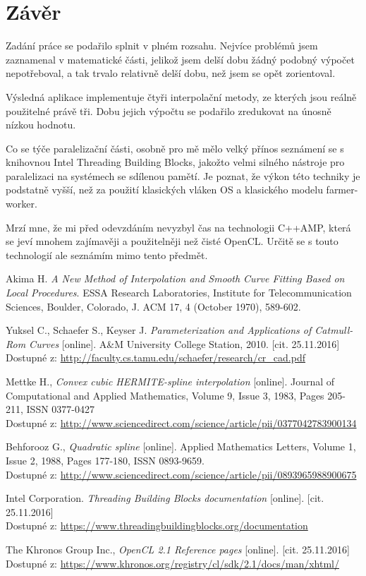 \documentclass[]{thesiskiv}
\begin{document}
\chapter{Závěr}

Zadání práce se podařilo splnit v plném rozsahu. Nejvíce problémů jsem zaznamenal v matematické části, jelikož jsem delší dobu žádný podobný výpočet nepotřeboval, a tak trvalo relativně delší dobu, než jsem se opět zorientoval.

Výsledná aplikace implementuje čtyři interpolační metody, ze kterých jsou reálně použitelné právě tři. Dobu jejich výpočtu se podařilo zredukovat na únosně nízkou hodnotu.

Co se týče paralelizační části, osobně pro mě mělo velký přínos seznámení se s knihovnou Intel Threading Building Blocks, jakožto velmi silného nástroje pro paralelizaci na systémech se sdílenou pamětí. Je poznat, že výkon této techniky je podstatně vyšší, než za použití klasických vláken OS a klasického modelu farmer-worker.

Mrzí mne, že mi před odevzdáním nevyzbyl čas na technologii C++AMP, která se jeví mnohem zajímavěji a použitelněji než čisté OpenCL. Určitě se s touto technologií ale seznámím mimo tento předmět.

\begin{thebibliography}{9}

  Akima H. \emph{A New Method of Interpolation and Smooth Curve Fitting Based on Local Procedures}. ESSA Research Laboratories, Institute for Telecommunication Sciences, Boulder, Colorado, J. ACM 17, 4 (October 1970), 589-602.
  
  Yuksel C., Schaefer S., Keyser J. \emph{Parameterization and Applications of
Catmull-Rom Curves} [online]. A\&M University College Station, 2010. [cit. 25.11.2016]\\ Dostupné z: \url{http://faculty.cs.tamu.edu/schaefer/research/cr_cad.pdf}

  Mettke H., \emph{Convex cubic HERMITE-spline interpolation} [online]. Journal of Computational and Applied Mathematics, Volume 9, Issue 3, 1983, Pages 205-211, ISSN 0377-0427\\
Dostupné z: \url{http://www.sciencedirect.com/science/article/pii/0377042783900134}

  Behforooz G., \emph{Quadratic spline} [online]. Applied Mathematics Letters, Volume 1, Issue 2, 1988, Pages 177-180, ISSN 0893-9659.\\
Dostupné z: \url{http://www.sciencedirect.com/science/article/pii/0893965988900675}

  Intel Corporation. \emph{Threading Building Blocks documentation} [online]. [cit. 25.11.2016]\\
Dostupné z: \url{https://www.threadingbuildingblocks.org/documentation}

  The Khronos Group Inc., \emph{OpenCL 2.1 Reference pages} [online]. [cit. 25.11.2016]\\
Dostupné z: \url{https://www.khronos.org/registry/cl/sdk/2.1/docs/man/xhtml/}
	
	
\end{thebibliography}  	
\end{document}
